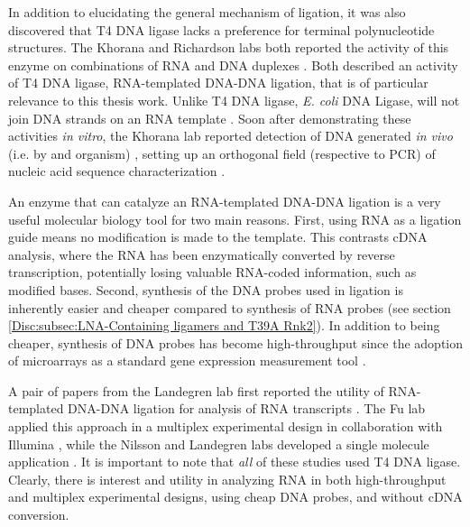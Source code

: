     In addition to elucidating the general mechanism of ligation, it was also discovered that T4 DNA ligase lacks a preference for terminal polynucleotide structures. The Khorana and Richardson labs both reported the activity of this enzyme on combinations of RNA and DNA duplexes \citep{Fareed1971, Kleppe1970b}. Both described an activity of T4 DNA ligase, RNA-templated DNA-DNA ligation, that is of particular relevance to this thesis work. Unlike T4 DNA ligase, \textit{E. coli} DNA Ligase, will not join DNA strands on an RNA template \citep{Bullard2006}. Soon after demonstrating these activities \textit{in vitro}, the Khorana lab reported detection of DNA generated \textit{in vivo} (i.e. by and organism) \citep{Besmer1972b}, setting up an orthogonal field (respective to PCR) of nucleic acid sequence characterization \citep{Conze2009c}.

    An enzyme that can catalyze an RNA-templated DNA-DNA ligation is a very useful molecular biology tool for two main reasons. First, using RNA as a ligation guide means no modification is made to the template. This contrasts cDNA analysis, where the RNA has been enzymatically converted by reverse transcription, potentially losing valuable RNA-coded information, such as modified bases. Second, synthesis of the DNA probes used in ligation is inherently easier and cheaper compared to synthesis of RNA probes (see section \ref{Disc:subsec:LNA-Containing ligamers and T39A Rnk2}). In addition to being cheaper, synthesis of DNA probes has become high-throughput since the adoption of microarrays as a standard gene expression measurement tool \citep{Schena1995a}. 

    A pair of papers from the Landegren lab first reported the utility of RNA-templated DNA-DNA ligation for analysis of RNA transcripts \citep{Nilsson2000,Nilsson2001}. The Fu lab applied this approach in a multiplex experimental design in collaboration with Illumina \citep{Li2012c,Yeakley2002}, while the Nilsson and Landegren labs developed a single molecule application \citep{Conze2010}. It is important to note that \textit{all} of these studies used T4 DNA ligase. Clearly, there is interest and utility in analyzing RNA in both high-throughput and multiplex experimental designs, using cheap DNA probes, and without cDNA conversion.

